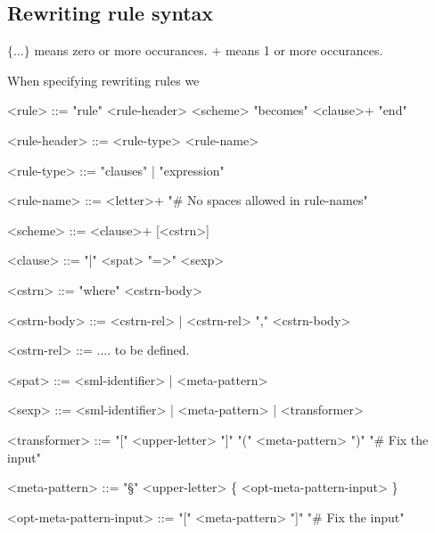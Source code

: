 \subsection{Rewriting rule syntax}

$\{ \ldots \}$ means zero or more occurances.
$+$ means 1 or more occurances.

When specifying rewriting rules we 


\setlength{\grammarindent}{7.3em}
\begin{grammar} 
 

  <rule> ::= "rule" <rule-header> <scheme> "becomes" <clause>+
  "end"

  <rule-header> ::= <rule-type> <rule-name>

  <rule-type> ::= "clauses" | "expression" 

  <rule-name> ::= <letter>+ \hfill "\# No spaces allowed in rule-names"

  <scheme> ::= <clause>+ [<cstrn>]


  <clause> ::= "|" <spat> "=>" <sexp>

  <cstrn> ::= "where" <cstrn-body> 

  <cstrn-body> ::= <cstrn-rel> | <cstrn-rel> "," <cstrn-body>

  <cstrn-rel> ::= .... to be defined.

  <spat> ::= <sml-identifier> | <meta-pattern>
  
  <sexp>   ::= <sml-identifier> | <meta-pattern> | <transformer>

  <transformer> ::= "[" <upper-letter> "]" "(" <meta-pattern> ")" \hfill "\# Fix the input"

  <meta-pattern> ::= "§" <upper-letter> \{ <opt-meta-pattern-input> \}

  <opt-meta-pattern-input> ::= "[" <meta-pattern> "]" \hfill "\# Fix the input" 

\end{grammar}

